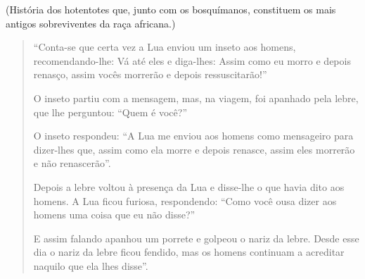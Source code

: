 \documentclass[
  letterpaper,
  DIV=11,
  numbers=noendperiod]{scrreprt}
\begin{document}
(História dos hotentotes que, junto com os bosquímanos, constituem os
mais antigos sobreviventes da raça africana.)

\begin{quote}
``Conta-se que certa vez a Lua enviou um inseto aos homens,
recomendando-lhe: Vá até eles e diga-lhes: Assim como eu morro e depois
renasço, assim vocês morrerão e depois ressuscitarão!''

O inseto partiu com a mensagem, mas, na viagem, foi apanhado pela lebre,
que lhe perguntou: ``Quem é você?''

O inseto respondeu: ``A Lua me enviou aos homens como mensageiro para
dizer-lhes que, assim como ela morre e depois renasce, assim eles
morrerão e não renascerão''.

Depois a lebre voltou à presença da Lua e disse-lhe o que havia dito aos
homens. A Lua ficou furiosa, respondendo: ``Como você ousa dizer aos
homens uma coisa que eu não disse?''

E assim falando apanhou um porrete e golpeou o nariz da lebre. Desde
esse dia o nariz da lebre ficou fendido, mas os homens continuam a
acreditar naquilo que ela lhes disse''.
\end{quote}
\end{document}
